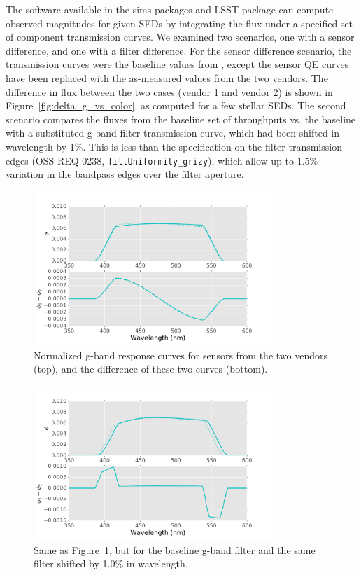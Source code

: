 \documentclass[DM]{lsstdoc}
\begin{document}
The software available in the sims packages and LSST  package
can compute observed magnitudes for given SEDs by integrating the flux under a
specified set of component transmission curves. We examined two scenarios, one
with a sensor difference, and one with a filter difference. For the sensor
difference scenario, the transmission curves were the baseline values from
, except the sensor QE curves have been replaced with the
as-measured values from the two vendors. The difference in flux between the two
cases (vendor 1 and vendor 2) is shown in Figure~\ref{fig:delta_g_vs_color}, as
computed for a few stellar SEDs. The second scenario compares the fluxes from
the baseline set of throughputs vs. the baseline with a substituted g-band
filter transmission curve, which had been shifted in wavelength by 1\%. This is
less than the specification on the filter transmission edges (OSS-REQ-0238,
\texttt{filtUniformity\_grizy}), which allow up to 1.5\% variation in the bandpass
edges over the filter aperture.

\begin{figure}
\includegraphics[width=0.8\textwidth]{figures/QE_response_curves.pdf}
\caption{Normalized g-band response curves for sensors from the two vendors
(top), and the difference of these two curves (bottom).
\label{fig:QE_response_curves}
}
\end{figure}

\begin{figure}
\includegraphics[width=0.8\textwidth]{figures/filter_response_curves.pdf}
\caption{Same as Figure~\ref{fig:QE_response_curves}, but for the baseline
g-band filter and the same filter shifted by 1.0\% in wavelength.
\label{fig:filter_response_curves}
}
\end{figure}
\end{document}
